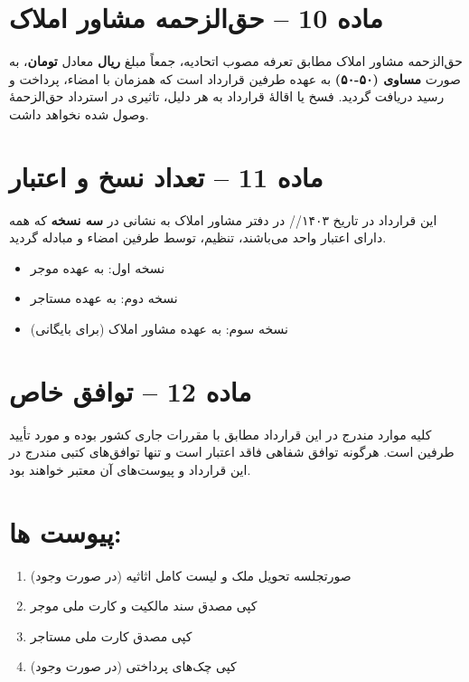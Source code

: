 \documentclass[14pt]{article}
\begin{document}
	\section*{ماده 10 – حق‌الزحمه مشاور املاک}
	حق‌الزحمه مشاور املاک مطابق تعرفه مصوب اتحادیه، جمعاً مبلغ
	\underline{\hspace{3cm}}
	\textbf{ریال} معادل
	\underline{\hspace{3cm}}
	\textbf{تومان}، به صورت
	\textbf{مساوی (۵۰-۵۰)} به عهده طرفین قرارداد است که همزمان با امضاء، پرداخت و رسید دریافت گردید. فسخ یا اقالهٔ قرارداد به هر دلیل، تاثیری در استرداد حق‌الزحمهٔ وصول شده نخواهد داشت.
	
	\section*{ماده 11 – تعداد نسخ و اعتبار}
	این قرارداد در تاریخ ۱۴۰۳/\underline{\hspace{.5cm}}/\underline{\hspace{.5cm}} در دفتر مشاور املاک
	\underline{\hspace{4cm}} به نشانی
	\underline{\hspace{6cm}} در
	\textbf{سه نسخه} که همه دارای اعتبار واحد می‌باشند، تنظیم، توسط طرفین امضاء و مبادله گردید.
	\begin{itemize}
		\item نسخه اول: به عهده موجر
		\item نسخه دوم: به عهده مستاجر
		\item نسخه سوم: به عهده مشاور املاک (برای بایگانی)
	\end{itemize}
	
	\section*{ماده 12 – توافق خاص}
	کلیه موارد مندرج در این قرارداد مطابق با مقررات جاری کشور بوده و مورد تأیید طرفین است. هرگونه توافق شفاهی فاقد اعتبار است و تنها توافق‌های کتبی مندرج در این قرارداد و پیوست‌های آن معتبر خواهند بود.
	
	\section*{پیوست ها:}
	\begin{enumerate}
		\item صورتجلسه تحویل ملک و لیست کامل اثاثیه (در صورت وجود)
		\item کپی مصدق سند مالکیت و کارت ملی موجر
		\item کپی مصدق کارت ملی مستاجر
		\item کپی چک‌های پرداختی (در صورت وجود)
	\end{enumerate}
	
\end{document}
